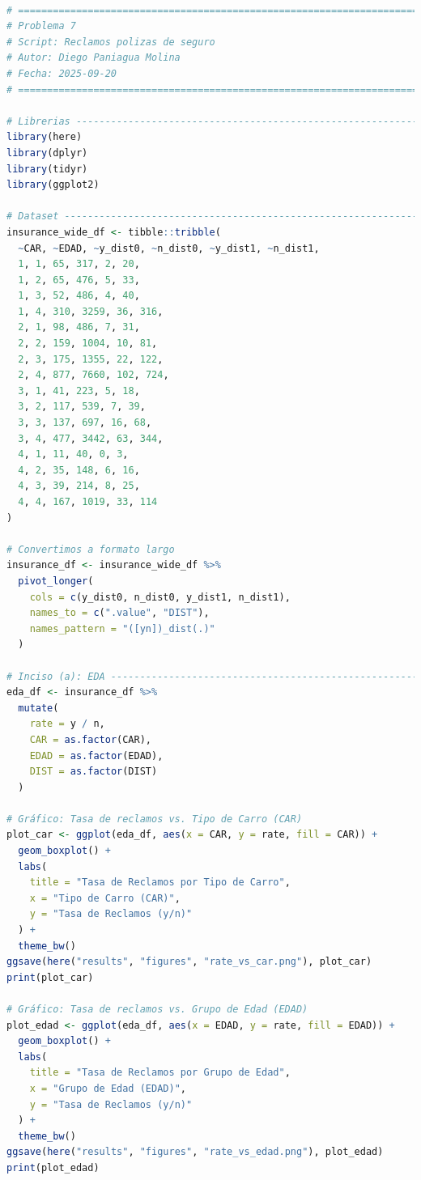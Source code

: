 \begin{lstlisting}[language=R, caption={Script: Reclamo polizas de seguros.}, label={lst:script8}]

# =============================================================================
# Problema 7 
# Script: Reclamos polizas de seguro
# Autor: Diego Paniagua Molina
# Fecha: 2025-09-20
# =============================================================================

# Librerias -------------------------------------------------------------------
library(here)
library(dplyr)
library(tidyr)
library(ggplot2)

# Dataset ---------------------------------------------------------------------
insurance_wide_df <- tibble::tribble(
  ~CAR, ~EDAD, ~y_dist0, ~n_dist0, ~y_dist1, ~n_dist1,
  1, 1, 65, 317, 2, 20,
  1, 2, 65, 476, 5, 33,
  1, 3, 52, 486, 4, 40,
  1, 4, 310, 3259, 36, 316,
  2, 1, 98, 486, 7, 31,
  2, 2, 159, 1004, 10, 81,
  2, 3, 175, 1355, 22, 122,
  2, 4, 877, 7660, 102, 724,
  3, 1, 41, 223, 5, 18,
  3, 2, 117, 539, 7, 39,
  3, 3, 137, 697, 16, 68,
  3, 4, 477, 3442, 63, 344,
  4, 1, 11, 40, 0, 3,
  4, 2, 35, 148, 6, 16,
  4, 3, 39, 214, 8, 25,
  4, 4, 167, 1019, 33, 114
)

# Convertimos a formato largo 
insurance_df <- insurance_wide_df %>%
  pivot_longer(
    cols = c(y_dist0, n_dist0, y_dist1, n_dist1),
    names_to = c(".value", "DIST"),
    names_pattern = "([yn])_dist(.)"
  )

# Inciso (a): EDA -------------------------------------------------------------
eda_df <- insurance_df %>%
  mutate(
    rate = y / n,
    CAR = as.factor(CAR),
    EDAD = as.factor(EDAD),
    DIST = as.factor(DIST)
  )

# Gráfico: Tasa de reclamos vs. Tipo de Carro (CAR)
plot_car <- ggplot(eda_df, aes(x = CAR, y = rate, fill = CAR)) +
  geom_boxplot() +
  labs(
    title = "Tasa de Reclamos por Tipo de Carro",
    x = "Tipo de Carro (CAR)",
    y = "Tasa de Reclamos (y/n)"
  ) +
  theme_bw()
ggsave(here("results", "figures", "rate_vs_car.png"), plot_car) 
print(plot_car)

# Gráfico: Tasa de reclamos vs. Grupo de Edad (EDAD)
plot_edad <- ggplot(eda_df, aes(x = EDAD, y = rate, fill = EDAD)) +
  geom_boxplot() +
  labs(
    title = "Tasa de Reclamos por Grupo de Edad",
    x = "Grupo de Edad (EDAD)",
    y = "Tasa de Reclamos (y/n)"
  ) +
  theme_bw()
ggsave(here("results", "figures", "rate_vs_edad.png"), plot_edad) 
print(plot_edad)


\end{lstlisting}
